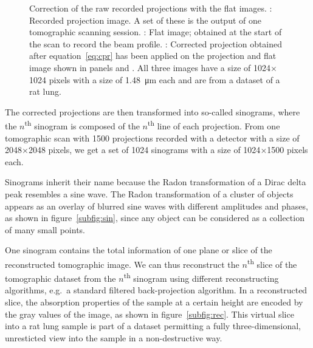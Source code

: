 \begin{figure}
{%
		\label{subfig:cpr}%
		}%
	\caption[Correction of the projections with flat images]{Correction of the raw recorded projections with the flat images. : Recorded projection image. A set of these is the output of one tomographic scanning session. : Flat image; obtained at the start of the scan to record the beam profile. : Corrected projection obtained after equation~\ref{eq:cpr} has been applied on the projection and flat image shown in panels  and . All three images have a size of 1024$\times$1024 pixels with a size of \SI{1.48}{\micro\meter} each and are from a dataset of a rat lung.}
	\label{fig:corrected projection}
\end{figure}

The corrected projections are then transformed into so-called sinograms, where the $n$\textsuperscript{th} sinogram is composed of the $n$\textsuperscript{th} line of each projection. From one tomographic scan with 1500 projections recorded with a detector with a size of 2048$\times$2048 pixels, we get a set of 1024 sinograms with a size of 1024$\times$1500 pixels each.

Sinograms inherit their name because the Radon transformation of a Dirac delta peak resembles a sine wave. The Radon transformation of a cluster of objects appears as an overlay of blurred sine waves with different amplitudes and phases, as shown in figure~\ref{subfig:sin}, since any object can be considered as a collection of many small points.

One sinogram contains the total information of one plane or slice of the reconstructed tomographic image. We can thus reconstruct the $n$\textsuperscript{th} slice of the tomographic dataset from the $n$\textsuperscript{th} sinogram using different reconstructing algorithms, e.g.\ a standard filtered back-projection algorithm. In a reconstructed slice, the absorption properties of the sample at a certain height are encoded by the gray values of the image, as shown in figure~\ref{subfig:rec}. This virtual slice into a rat lung sample is part of a dataset permitting a fully three-dimensional, unresticted view into the sample in a non-destructive way.

